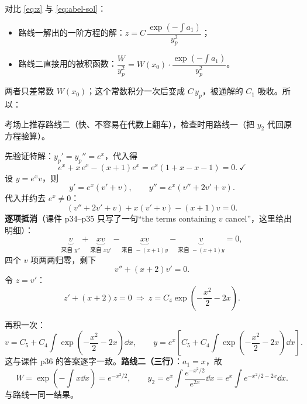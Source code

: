 \documentclass[11pt]{ctexart}
\begin{document}
对比 \eqref{eq:z} 与 \eqref{eq:abel-sol}：
\begin{itemize}
\item 路线一解出的一阶方程的解：$z=C\,\dfrac{\exp\left(-\int a_1\right)}{y_p^{2}}$；
\item 路线二直接用的被积函数：$\dfrac{W}{y_p^{2}}=W(x_0)\cdot\dfrac{\exp\left(-\int a_1\right)}{y_p^{2}}$。
\end{itemize}
两者只差常数 $W(x_0)$；这个常数积分一次后变成 $C\,y_p$，被通解的 $C_1$ 吸收。所以：


考场上推荐路线二（快、不容易在代数上翻车），检查时用路线一（把 $y_2$ 代回原方程验算）。

先验证特解：$y_p'=y_p''=e^x$，代入得
\[
e^x+x\,e^x-(x+1)e^x=e^x\left(1+x-x-1\right)=0 .\ \checkmark
\]
设 $y=e^x v$，则
\[
y'=e^x(v'+v),\qquad y''=e^x\left(v''+2v'+v\right).
\]
代入并约去 $e^x\neq0$：
\[
\left(v''+2v'+v\right)+x\left(v'+v\right)-(x+1)v=0 .
\]
\textbf{逐项抵消}（课件 p34--p35 只写了一句“the terms containing $v$ cancel”，这里给出明细）：
\[
\underbrace{v}_{\text{来自 }y''}+\underbrace{xv}_{\text{来自 }xy'}-\underbrace{xv}_{\text{来自 }-(x+1)y}-\underbrace{v}_{\text{来自 }-(x+1)y}=0 ,
\]
四个 $v$ 项两两归零，剩下
\[
v''+(x+2)v'=0 .
\]
令 $z=v'$：
\[
z'+(x+2)z=0\ \Longrightarrow\ z=C_4\exp\left(-\frac{x^{2}}2-2x\right).
\]


再积一次：
\[
v=C_5+C_4\int\exp\left(-\frac{x^{2}}2-2x\right)\dd x,
\qquad
y=e^x\left[C_5+C_4\int\exp\left(-\frac{x^{2}}2-2x\right)\dd x\right].
\]
这与课件 p36 的答案逐字一致。\textbf{路线二（三行）}：$a_1=x$，故
\[
W=\exp\left(-\int x\dd x\right)=e^{-x^{2}/2},
\qquad
y_2=e^x\int\frac{e^{-x^{2}/2}}{e^{2x}}\dd x=e^x\int e^{-x^{2}/2-2x}\dd x .
\]
与路线一同一结果。
\end{document}
